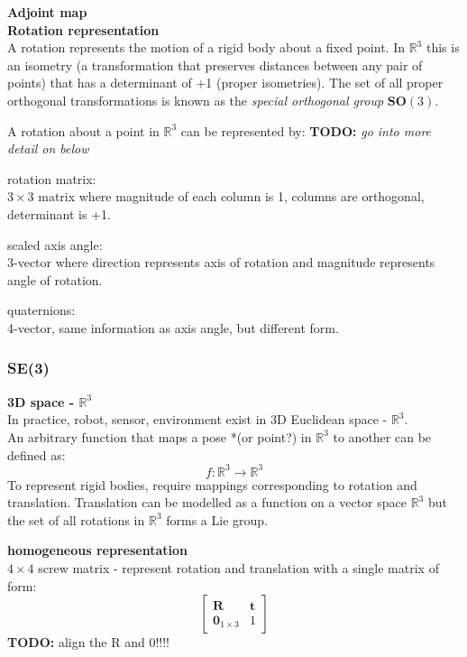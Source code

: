		\textbf{Adjoint map}\\
		
		\textbf{Rotation representation}\\
		A rotation represents the motion of a rigid body about a fixed point. In $\mathbb{R}^3$ this is an isometry (a transformation that preserves distances between any pair of points) that has a determinant of +1 (proper isometries). The set of all proper orthogonal transformations is known as the \textit{special orthogonal group} $\textbf{SO}(3)$.
		
		A rotation about a point in $\mathbb{R}^3$ can be represented by: \textbf{TODO:} \textit{go into more detail on below}
		
		rotation matrix:\\
		$3 \times 3$ matrix where magnitude of each column is 1, columns are orthogonal, determinant is +1.
		
		scaled axis angle:\\
		3-vector where direction represents axis of rotation and magnitude represents angle of rotation.		
		
		quaternions:\\
		4-vector, same information as axis angle, but different form.\\
		
	\subsubsection{\textbf{SE}(3)}		
		\textbf{3D space - $\mathbb{R}^3$}\\
		In practice, robot, sensor, environment exist in 3D Euclidean space - $\mathbb{R}^3$.\\
		An arbitrary function that maps a pose *(or point?) in $\mathbb{R}^3$ to another can be defined as:
		\begin{equation}
		f: \mathbb{R}^3 \rightarrow \mathbb{R}^3
		\end{equation}
		To represent rigid bodies, require mappings corresponding to rotation and translation. Translation can be modelled as a function on a vector space $\mathbb{R}^3$ but the set of all rotations in $\mathbb{R}^3$ forms a Lie group. 

		\textbf{homogeneous representation}\\
		$4 \times 4$ screw matrix - represent rotation and translation with a single matrix of form:\\
		
		\begin{equation}
				\begin{bmatrix}
				  \mathbf{R}	&	\mathbf{t} \\
				  \textbf{0}_{1 \times 3}		& 	1 
				\end{bmatrix}
		\end{equation}
		\textbf{TODO:} align the R and 0!!!!

